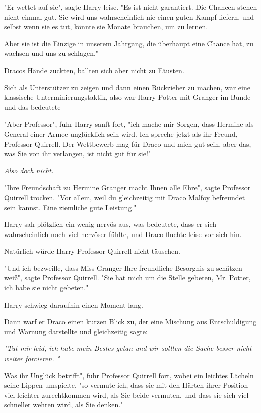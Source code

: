{"Er wettet auf sie", sagte Harry leise. "Es ist nicht garantiert. Die Chancen stehen nicht einmal gut. Sie wird uns wahrscheinlich nie einen guten Kampf liefern, und selbst wenn sie es tut, könnte sie Monate brauchen, um zu lernen.

Aber sie ist die Einzige in unserem Jahrgang, die überhaupt eine Chance hat, zu wachsen und uns zu schlagen."

Dracos Hände zuckten, ballten sich aber nicht zu Fäusten.

Sich als Unterstützer zu zeigen und dann einen Rückzieher zu machen, war eine klassische Unterminierungstaktik, also war Harry Potter mit Granger im Bunde und das bedeutete -

"Aber Professor", fuhr Harry sanft fort, "ich mache mir Sorgen, dass Hermine als General einer Armee unglücklich sein wird. Ich spreche jetzt als ihr Freund, Professor Quirrell. Der Wettbewerb mag für Draco und mich gut sein, aber das, was Sie von ihr verlangen, ist nicht gut für sie!"

\emph{Also doch nicht.}

"Ihre Freundschaft zu Hermine Granger macht Ihnen alle Ehre", sagte Professor Quirrell trocken. "Vor allem, weil du gleichzeitig mit Draco Malfoy befreundet sein kannst. Eine ziemliche gute Leistung."

Harry sah plötzlich ein wenig nervös aus, was bedeutete, dass er sich wahrscheinlich noch viel nervöser fühlte, und Draco fluchte leise vor sich hin.

Natürlich würde Harry Professor Quirrell nicht täuschen.

"Und ich bezweifle, dass Miss Granger Ihre freundliche Besorgnis zu schätzen weiß", sagte Professor Quirrell. "Sie hat mich um die Stelle gebeten, Mr. Potter, ich habe sie nicht gebeten."

Harry schwieg daraufhin einen Moment lang.

Dann warf er Draco einen kurzen Blick zu, der eine Mischung aus Entschuldigung und Warnung darstellte und gleichzeitig sagte:

\emph{"Tut mir leid, ich habe mein Bestes getan und wir sollten die Sache besser nicht weiter forcieren. "}

Was ihr Unglück betrifft", fuhr Professor Quirrell fort, wobei ein leichtes Lächeln seine Lippen umspielte, "so vermute ich, dass sie mit den Härten ihrer Position viel leichter zurechtkommen wird, als Sie beide vermuten, und dass sie sich viel schneller wehren wird, als Sie denken."

}
